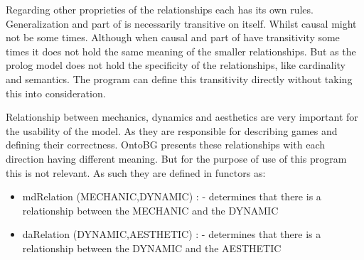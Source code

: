 Regarding other proprieties of the relationships each has its own rules. Generalization and part of is necessarily transitive on itself. Whilst causal might not be some times. Although when causal and part of have transitivity some times it does not hold the same meaning of the smaller relationships. But as the prolog model does not hold the specificity of the relationships, like cardinality and semantics. The program can define this transitivity directly without taking this into consideration.

Relationship between mechanics, dynamics and aesthetics are very important for the usability of the model. As they are responsible for describing games and defining their correctness. OntoBG presents these relationships with each direction having different meaning. But for the purpose of use of this program this is not relevant. As such they are defined in functors as:
\begin{itemize}
    \item mdRelation (MECHANIC,DYNAMIC) : - determines that there is a relationship between the MECHANIC and the DYNAMIC
    \item daRelation (DYNAMIC,AESTHETIC) : - determines that there is a relationship between the DYNAMIC and the AESTHETIC
\end{itemize}